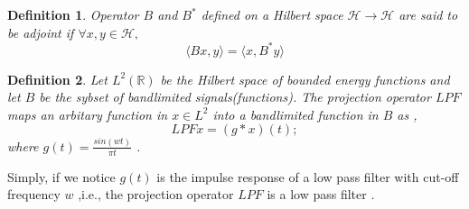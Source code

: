 \documentclass{article}
\newtheorem{defn}{Definition}[section]
\begin{document}
\begin{defn}
Operator $B$ and $B^{*}$ defined on a Hilbert space $\mathcal{H} \rightarrow \mathcal{H}$ are said to be adjoint if $\forall x,y \in \mathcal{H} ,$\\
\begin{equation}
    \langle Bx,y \rangle = \langle x,B^{*}y \rangle
\end{equation}
\end{defn}



\begin{defn}
Let $L^{2}(\mathbb{R})$ be the Hilbert space of bounded energy functions and let $B$ be the sybset of bandlimited signals(functions). The projection operator $LPF$ maps an arbitary function in $x \in L^2$ into a bandlimited function in $B$ as ,
\begin{equation}
    LPFx = (g*x)(t) ;
\end{equation}
where $g(t) = \frac{sin(wt)}{\pi t}$ .\\
\end{defn}
Simply, if we notice $g(t)$ is the impulse response of a low pass filter with cut-off frequency $w$ ,i.e., the projection operator $LPF$ is a low pass filter .


\newpage
\end{document}
